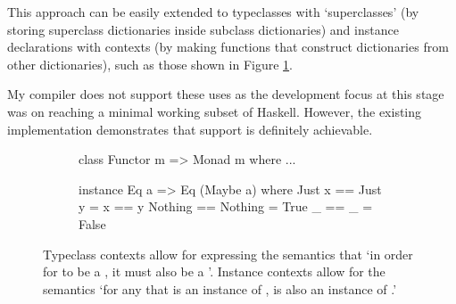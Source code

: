 \documentclass[dissertation.tex]{subfiles}
\begin{document}
{{{            This approach can be easily extended to typeclasses with `superclasses' (by storing superclass dictionaries inside subclass dictionaries) and instance declarations with contexts (by making functions that construct dictionaries from other dictionaries), such as those shown in Figure \ref{fig:instance-context}. 

            My compiler does not support these uses as the development focus at this stage was on reaching a minimal working subset of Haskell. However, the existing implementation demonstrates that support is definitely achievable.

            \begin{figure}[h]
            \centering
            \begin{subfigure}[t]{0.40\textwidth}
            \begin{haskellfigure}
            class Functor m => Monad m where
                ...
            \end{haskellfigure}
            \end{subfigure}
            \hspace{5mm}
            \begin{subfigure}[t]{0.40\textwidth}
            \begin{haskellfigure}
            instance Eq a => Eq (Maybe a) where
                Just x == Just y = x == y
                Nothing == Nothing = True
                _ == _ = False
            \end{haskellfigure}
            \end{subfigure}
            \caption{Typeclass contexts allow for expressing the semantics that `in order for  to be a , it must also be a '. Instance contexts allow for the semantics `for any  that is an instance of ,  is also an instance of .'}
            \label{fig:instance-context}
            \end{figure}
        }
    }
}
\end{document}
